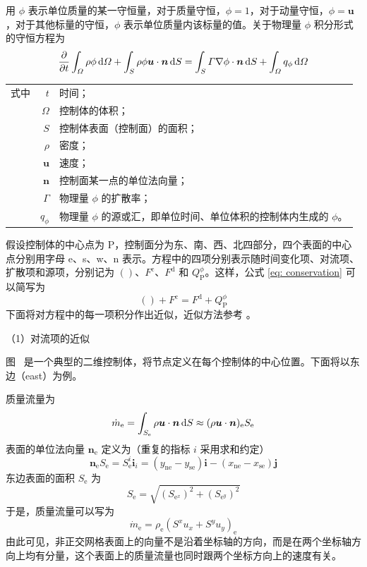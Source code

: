 用 $\phi$ 表示单位质量的某一守恒量，对于质量守恒，$\phi=1$，对于动量守恒，$\phi=\bm{u}$，对于其他标量的守恒，$\phi$ 表示单位质量内该标量的值。关于物理量 $\phi$ 积分形式的守恒方程为
\begin{equation}\label{eq: conservation}
	\frac{\partial}{\partial t}\int_{\varOmega}\rho\phi\,\mathrm{d}\varOmega +
	\int_S\rho\phi\bm{u}\cdot\bm{n}\,\mathrm{d} S =
	\int_S\varGamma\nabla\phi\cdot\bm{n}\,\mathrm{d} S +
	\int_{\varOmega}q_{\phi}\,\mathrm{d}\varOmega
\end{equation}
\begin{tabularx}{\textwidth}{@{}l@{\quad}r@{——}X@{}}
	式中 & $t$ & 时间；\\
		& $\varOmega$ & 控制体的体积；\\
		& $S$ & 控制体表面（控制面）的面积；\\
		& $\rho$ & 密度；\\
		& $\bm{u}$ & 速度；\\
		& $\bm{n}$ & 控制面某一点的单位法向量；\\
		& $\varGamma$ & 物理量 $\phi$ 的扩散率；\\
		& $q_{\phi}$ & 物理量 $\phi$ 的源或汇，即单位时间、单位体积的控制体内生成的 $\phi$。
\end{tabularx}\vspace{3.15bp}
假设控制体的中心点为 P，控制面分为东、南、西、北四部分，四个表面的中心点分别用字母 e、s、w、n 表示。方程中的四项分别表示随时间变化项、对流项、扩散项和源项，分别记为 $()$、$F^{\mathrm{c}}$、$F^{\mathrm{d}}$ 和 $Q_{\mathrm{P}}^{\phi}$。这样，公式 \eqref{eq: conservation} 可以简写为
\begin{equation}
	() + F^{\mathrm{c}} = F^{\mathrm{d}} + Q_{\mathrm{P}}^{\phi}
\end{equation}
下面将对方程中的每一项积分作出近似，近似方法参考 \cite{}。

（1）对流项的近似

图~ 是一个典型的二维控制体，将节点定义在每个控制体的中心位置。下面将以东边（east）为例。

质量流量为
\begin{equation}
	\dot m_{\mathrm{e}} = \int_{S_{\mathrm{e}}}\rho\bm{u}\cdot\bm{n}\,\mathrm{d} S \approx 
	(\rho\bm{u}\cdot\bm{n})_{\mathrm{e}} S_{\mathrm{e}}
\end{equation}
表面的单位法向量 $\bm{n}_{\mathrm{e}}$ 定义为（重复的指标 $i$ 采用求和约定）
\begin{equation}
	\bm{n}_{\mathrm{e}}S_{\mathrm{e}} = S_{\mathrm{e}}^i \bm{i}_i = 
	(y_{\mathrm{ne}}-y_{\mathrm{se}})\bm{i} - (x_{\mathrm{ne}}-x_{\mathrm{se}})\bm{j}
\end{equation}
东边表面的面积 $S_{\mathrm{e}}$ 为
\begin{equation}
	S_{\mathrm{e}} = \sqrt{(S_{\mathrm{e}^x})^2 + (S_{\mathrm{e}^y})^2}
\end{equation}
于是，质量流量可以写为
\begin{equation}
	\dot m_{\mathrm{e}} = \rho_{\mathrm{e}}(S^x u_x + S^y u_y)_{\mathrm{e}}
\end{equation}
由此可见，非正交网格表面上的向量不是沿着坐标轴的方向，而是在两个坐标轴方向上均有分量，这个表面上的质量流量也同时跟两个坐标方向上的速度有关。

